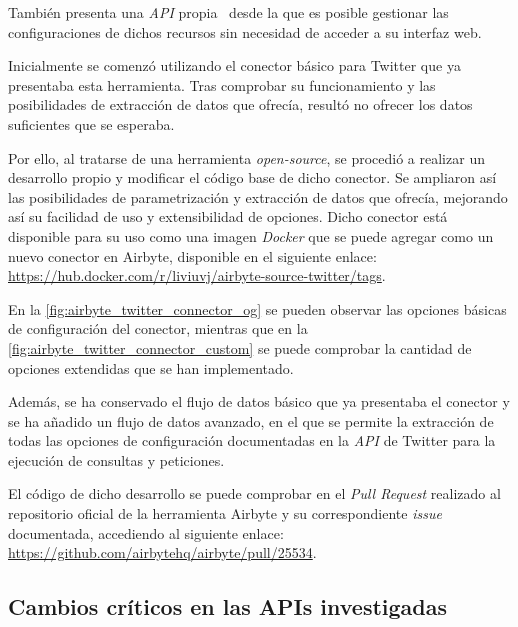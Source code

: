 También presenta una \textit{API} propia~\cite{airbyteAPI} desde la que es posible gestionar las configuraciones de dichos recursos sin necesidad de acceder a su interfaz web.


Inicialmente se comenzó utilizando el conector básico para Twitter que ya presentaba esta herramienta. Tras comprobar su funcionamiento y las posibilidades de extracción de datos que ofrecía, resultó no ofrecer los datos suficientes que se esperaba.

Por ello, al tratarse de una herramienta \textit{open-source}, se procedió a realizar un desarrollo propio y modificar el código base de dicho conector. Se ampliaron así las posibilidades de parametrización y extracción de datos que ofrecía, mejorando así su facilidad de uso y extensibilidad de opciones. Dicho conector está disponible para su uso como una imagen \textit{Docker} que se puede agregar como un nuevo conector en Airbyte, disponible en el siguiente enlace: \url{https://hub.docker.com/r/liviuvj/airbyte-source-twitter/tags}.


En la \autoref{fig:airbyte_twitter_connector_og} se pueden observar las opciones básicas de configuración del conector, mientras que en la \autoref{fig:airbyte_twitter_connector_custom} se puede comprobar la cantidad de opciones extendidas que se han implementado.

Además, se ha conservado el flujo de datos básico que ya presentaba el conector y se ha añadido un flujo de datos avanzado, en el que se permite la extracción de todas las opciones de configuración documentadas en la \textit{API} de Twitter para la ejecución de consultas y peticiones.

El código de dicho desarrollo se puede comprobar en el \textit{Pull Request} realizado al repositorio oficial de la herramienta Airbyte y su correspondiente \textit{issue} documentada, accediendo al siguiente enlace: \url{https://github.com/airbytehq/airbyte/pull/25534}.


\subsection{Cambios críticos en las APIs investigadas}

